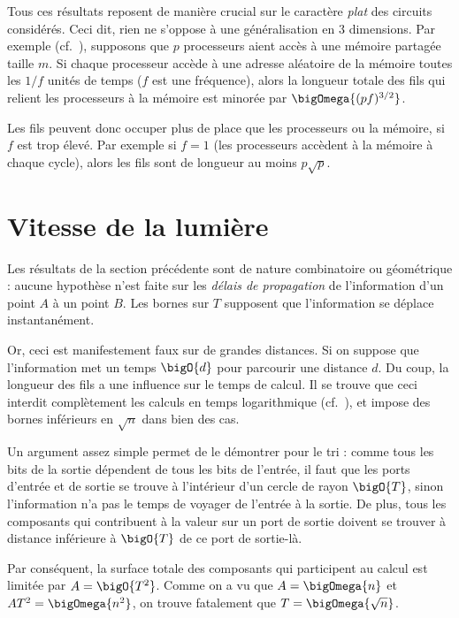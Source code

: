 Tous ces résultats reposent de manière crucial sur le caractère \emph{plat} des
circuits considérés. Ceci dit, rien ne s'oppose à une généralisation en 3
dimensions. Par exemple (cf.~\cite{Wiener04}), supposons que $p$ processeurs
aient accès à une mémoire partagée taille $m$. Si chaque processeur accède à une
adresse aléatoire de la mémoire toutes les $1/f$ unités de temps ($f$ est une
fréquence), alors la longueur totale des fils qui relient les processeurs à la
mémoire est minorée par $\bigOmega{(pf)^{3/2}}$.

Les fils peuvent donc occuper plus de place que les processeurs ou la mémoire,
si $f$ est trop élevé. Par exemple si $f = 1$ (les processeurs accèdent à la
mémoire à chaque cycle), alors les fils sont de longueur au moins $p \sqrt{p}$.

\section{Vitesse de la lumière}

Les résultats de la section précédente sont de nature combinatoire ou
géométrique : aucune hypothèse n'est faite sur les \emph{délais de propagation}
de l'information d'un point $A$ à un point $B$. Les bornes sur $T$ supposent que
l'information se déplace instantanément.

Or, ceci est manifestement faux sur de grandes distances. Si on suppose que
l'information met un temps $\bigO{d}$ pour parcourir une distance $d$. Du coup,
la longueur des fils a une influence sur le temps de calcul. Il se trouve que
ceci interdit complètement les calculs en temps logarithmique
(cf.~\cite{ChazelleM81}), et impose des bornes inférieurs en $\sqrt{n}$ dans
bien des cas.

\begin{danger}
Un argument assez simple permet de le démontrer pour le tri : comme tous les
bits de la sortie dépendent de tous les bits de l'entrée, il faut que les ports
d'entrée et de sortie se trouve à l'intérieur d'un cercle de rayon $\bigO{T}$,
sinon l'information n'a pas le temps de voyager de l'entrée à la sortie. De
plus, tous les composants qui contribuent à la valeur sur un port de sortie
doivent se trouver à distance inférieure à $\bigO{T}$ de ce port de sortie-là.

Par conséquent, la surface totale des composants qui participent au calcul est
limitée par $A = \bigO{T^2}$. Comme on a vu que $A = \bigOmega{n}$ et
$AT^2 = \bigOmega{n^2}$, on trouve fatalement que $T = \bigOmega{\sqrt{n}}$.
\end{danger}

